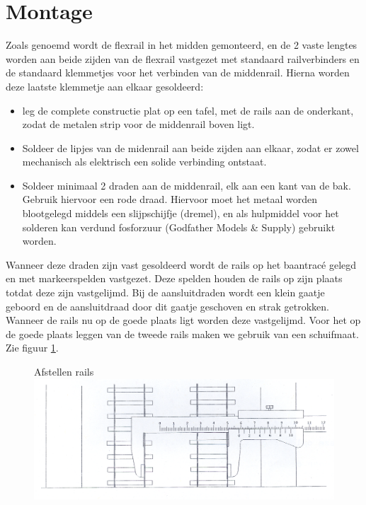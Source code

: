 \documentclass[12pt,a4paper]{report}
\newcommand*{\trace}{trac\'{e} }
\begin{document}
\section{Montage}
Zoals genoemd wordt de flexrail in het midden gemonteerd, en de 2 vaste lengtes worden aan beide zijden van de flexrail vastgezet met standaard railverbinders en de standaard klemmetjes voor het verbinden van de middenrail. Hierna worden deze laatste klemmetje aan elkaar gesoldeerd:

\begin{itemize}
\item leg de complete constructie plat op een tafel, met de rails aan de onderkant, zodat de metalen strip voor de middenrail boven ligt.
\item Soldeer de lipjes van de midenrail aan beide zijden aan elkaar, zodat er zowel mechanisch als elektrisch een solide verbinding ontstaat.
\item Soldeer minimaal 2 draden aan de middenrail, elk aan een kant van de bak. Gebruik hiervoor een rode draad. Hiervoor moet het metaal worden blootgelegd middels een slijpschijfje (dremel), en als hulpmiddel voor het solderen kan verdund fosforzuur (Godfather Models \& Supply) gebruikt worden.
\end{itemize}

Wanneer deze draden zijn vast gesoldeerd wordt de rails op het baan\trace gelegd en met markeerspelden vastgezet. Deze spelden houden de rails op zijn plaats totdat deze zijn vastgelijmd. Bij de aansluitdraden wordt een klein gaatje geboord en de aansluitdraad door dit gaatje geschoven en strak getrokken. Wanneer de rails nu op de goede plaats ligt worden deze vastgelijmd. Voor het op de goede plaats leggen van de tweede rails maken we gebruik van een schuifmaat. Zie figuur \ref{figuur5}.

\begin{figure}[ht]
  \captionbox
  {Afstellen rails\label{figuur5}}
  {\includegraphics[scale=1.0]{images/rcu_figuur5}}
\end{figure}
\end{document}
